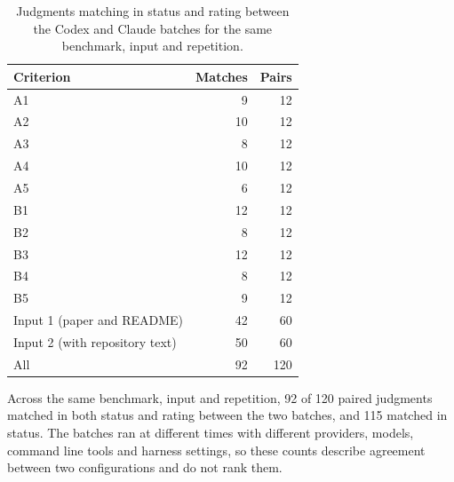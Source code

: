 \begin{table}[t]
\caption{Judgments matching in status and rating between the Codex and Claude batches for the same benchmark, input and repetition.}
\label{tab:cross-batch}
\centering\begin{tabular}{lrr}\toprule
Criterion & Matches & Pairs \\
\midrule
A1 & 9 & 12 \\
A2 & 10 & 12 \\
A3 & 8 & 12 \\
A4 & 10 & 12 \\
A5 & 6 & 12 \\
B1 & 12 & 12 \\
B2 & 8 & 12 \\
B3 & 12 & 12 \\
B4 & 8 & 12 \\
B5 & 9 & 12 \\
\midrule
Input 1 (paper and README) & 42 & 60 \\
Input 2 (with repository text) & 50 & 60 \\
All & 92 & 120 \\
\bottomrule\end{tabular}
\end{table}
Across the same benchmark, input and repetition, 92 of 120 paired judgments matched in both status and rating between the two batches, and 115 matched in status. The batches ran at different times with different providers, models, command line tools and harness settings, so these counts describe agreement between two configurations and do not rank them.
